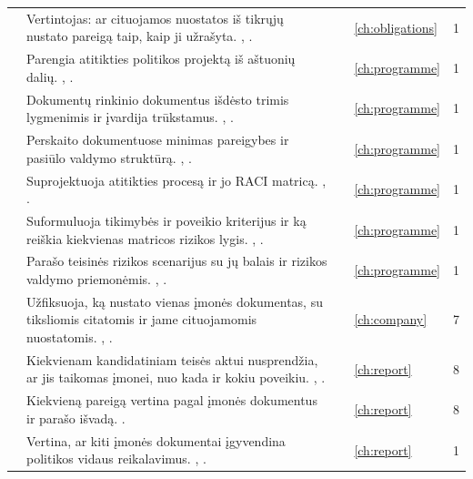 \begin{xltabular}{\textwidth}{@{}L{40mm}YL{21mm}L{17mm}r@{}}
 & Vertintojas: ar cituojamos nuostatos iš tikrųjų nustato pareigą taip, kaip ji užrašyta. , . &  & \cref{ch:obligations} & 1 \\
 & Parengia atitikties politikos projektą iš aštuonių dalių. , . &  & \cref{ch:programme} & 1 \\
 & Dokumentų rinkinio dokumentus išdėsto trimis lygmenimis ir įvardija trūkstamus. , . &  & \cref{ch:programme} & 1 \\
 & Perskaito dokumentuose minimas pareigybes ir pasiūlo valdymo struktūrą. , . &  & \cref{ch:programme} & 1 \\
 & Suprojektuoja atitikties procesą ir jo RACI matricą. , . &  & \cref{ch:programme} & 1 \\
 & Suformuluoja tikimybės ir poveikio kriterijus ir ką reiškia kiekvienas matricos rizikos lygis. , . &  & \cref{ch:programme} & 1 \\
 & Parašo teisinės rizikos scenarijus su jų balais ir rizikos valdymo priemonėmis. , . &  & \cref{ch:programme} & 1 \\
 & Užfiksuoja, ką nustato vienas įmonės dokumentas, su tiksliomis citatomis ir jame cituojamomis nuostatomis. , . &  & \cref{ch:company} & 7 \\
 & Kiekvienam kandidatiniam teisės aktui nusprendžia, ar jis taikomas įmonei, nuo kada ir kokiu poveikiu. , . &  & \cref{ch:report} & 8 \\
 & Kiekvieną pareigą vertina pagal įmonės dokumentus ir parašo išvadą. . &  & \cref{ch:report} & 8 \\
 & Vertina, ar kiti įmonės dokumentai įgyvendina politikos vidaus reikalavimus. , . &  & \cref{ch:report} & 1 \\

\end{xltabular}
